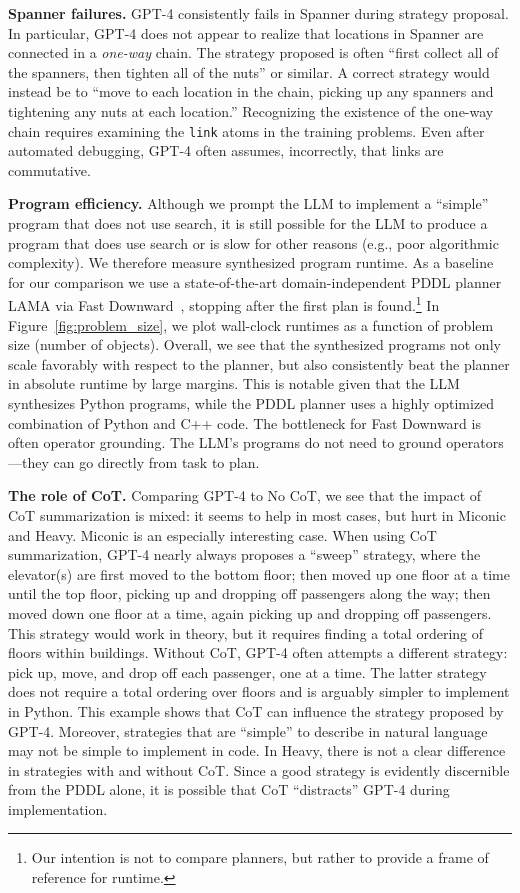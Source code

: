 \documentclass[letterpaper]{article} %
\begin{document}
\textbf{Spanner failures.}
GPT-4 consistently fails in Spanner during strategy proposal.
In particular, GPT-4 does not appear to realize that locations in Spanner are connected in a \emph{one-way} chain.
The strategy proposed is often ``first collect all of the spanners, then tighten all of the nuts'' or similar.
A correct strategy would instead be to ``move to each location in the chain, picking up any spanners and tightening any nuts at each location.''
Recognizing the existence of the one-way chain requires examining the \texttt{link} atoms in the training problems.
Even after automated debugging, GPT-4 often assumes, incorrectly, that links are commutative.

\textbf{Program efficiency.}
Although we prompt the LLM to implement a ``simple'' program that does not use search, it is still possible for the LLM to produce a program that does use search or is slow for other reasons (e.g., poor algorithmic complexity).
We therefore measure synthesized program runtime. As a baseline for our comparison we use a state-of-the-art domain-independent PDDL planner LAMA \cite{richter2010lama} via Fast Downward~\cite{fd}, stopping after the first plan is found.\footnote{Our intention is not to compare planners, but rather to provide a frame of reference for runtime.}
In Figure~\ref{fig:problem_size}, we plot wall-clock runtimes as a function of problem size (number of objects).
Overall, we see that the synthesized programs not only scale favorably with respect to the planner, but also consistently beat the planner in absolute runtime by large margins.
This is notable given that the LLM synthesizes Python programs, while the PDDL planner uses a highly optimized combination of Python and C++ code.
The bottleneck for Fast Downward is often operator grounding.
The LLM's programs do not need to ground operators---they can go directly from task to plan.

\textbf{The role of CoT.}
Comparing GPT-4 to No CoT, we see that the impact of CoT summarization is mixed: it seems to help in most cases, but hurt in Miconic and Heavy.
Miconic is an especially interesting case.
When using CoT summarization, GPT-4 nearly always proposes a ``sweep'' strategy, where the elevator(s) are first moved to the bottom floor; then moved up one floor at a time until the top floor, picking up and dropping off passengers along the way; then moved down one floor at a time, again picking up and dropping off passengers.
This strategy would work in theory, but it requires finding a total ordering of floors within buildings.
Without CoT, GPT-4 often attempts a different strategy: pick up, move, and drop off each passenger, one at a time.
The latter strategy does not require a total ordering over floors and is arguably simpler to implement in Python.
This example shows that CoT can influence the strategy proposed by GPT-4.
Moreover, strategies that are ``simple'' to describe in natural language may not be simple to implement in code.
In Heavy, there is not a clear difference in strategies with and without CoT.
Since a good strategy is evidently discernible from the PDDL alone, it is possible that CoT ``distracts'' GPT-4 during implementation.
\end{document}
